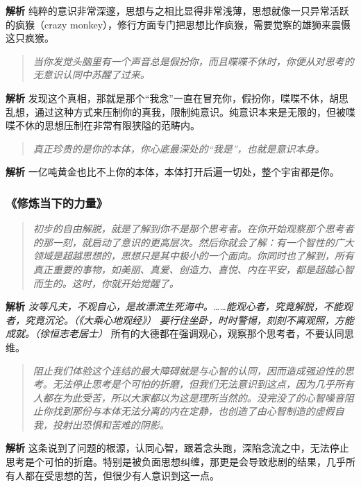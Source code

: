 \textbf{解析} 纯粹的意识非常深邃，思想与之相比显得非常浅薄，思想就像一只异常活跃的疯猴（crazy monkey），修行方面专门把思想比作疯猴，需要觉察的雄狮来震慑这只疯猴。

\begin{quote}\it
    当你发觉头脑里有一个声音总是假扮你，而且喋喋不休时，你便从对思考的无意识认同中苏醒了过来。
\end{quote}

\textbf{解析} 发现这个真相，那就是那个“我念”一直在冒充你，假扮你，喋喋不休，胡思乱想，通过这种方式来压制你的真我，限制纯意识。纯意识本来是无限的，但被喋喋不休的思想压制在非常有限狭隘的范畴内。

\begin{quote}\it
    真正珍贵的是你的本体，你心底最深处的“我是”，也就是意识本身。
\end{quote}

\textbf{解析} 一亿吨黄金也比不上你的本体，本体打开后遍一切处，整个宇宙都是你。

\subsubsection{《修炼当下的力量》}

\begin{quote}\it
    初步的自由解脱，就是了解到你不是那个思考者。在你开始观察那个思考者的那一刻，就启动了意识的更高层次。然后你就会了解：有一个智性的广大领域是超越思想的，思想只是其中极小的一个面向。你同时也了解到，所有真正重要的事物，如美丽、真爱、创造力、喜悦、内在平安，都是超越心智而生的。这时，你就开始觉醒了。
\end{quote}

\textbf{解析} \textit{汝等凡夫，不观自心，是故漂流生死海中。……能观心者，究竟解脱，不能观者，究竟沉沦。（《大乘心地观经》）} \textit{要行住坐卧，时时警惕，刻刻不离观照，方能成就。（徐恒志老居士）} 所有的大德都在强调观心，观察那个思考者，不要认同思维。

\begin{quote}\it
    阻止我们体验这个连结的最大障碍就是与心智的认同，因而造成强迫性的思考。无法停止思考是个可怕的折磨，但我们无法意识到这点，因为几乎所有人都在为此受苦，所以大家都以为这是理所当然的。没完没了的心智噪音阻止你找到那份与本体无法分离的内在定静，也创造了由心智制造的虚假自我，投射出恐惧和苦难的阴影。
\end{quote}

\textbf{解析} 这条说到了问题的根源，认同心智，跟着念头跑，深陷念流之中，无法停止思考是个可怕的折磨。特别是被负面思想纠缠，那更是会导致悲剧的结果，几乎所有人都在受思想的苦，但很少有人意识到这一点。

